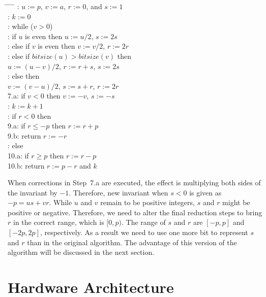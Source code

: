 \documentclass[twocolumn]{IEEEtran}
\begin{document}
\begin{tabbing}
\hspace*{0cm} \= \hspace{0.8cm} \= \hspace{0.5cm} \= \hspace{0.5cm} \= \kill
{}:  \> $u:=p$, $v:=a$, $r:=0$, and $s:=1$\\
:  \> $k:=0$\\
:  \> while ($v > 0$) \\
:  \> \> if $u$ is even then $u:=u/2$, $s:=2s$ \\
:  \> \> else if $v$ is even then $v:=v/2$, $r:=2r$ \\
:  \> \> else if $bitsize(u) > bitsize(v)$ then \\
\>     \> \> \> $u:=(u-v)/2$, $r:=r+s$, $s:=2s$ \\
:  \> \> else then \\
\>     \> \> \> $v:=(v-u)/2$, $s:=s+r$, $r:=2r$ \\
\> 7.a:\> \> \> if $v<0$ then $v := -v$, $s := -s$ \\ 
:  \> \> $k:=k+1$\\
:  \> if $r<0$ then \\
\> 9.a:\> \> if $r \leq -p$ then $r:=r+p$ \\
\> 9.b:\> \> return $r:=-r$ \\
: \> else \\ 
\> 10.a: \> \> if $r \geq p$ then $r:=r-p$ \\
\> 10.b:\> \> return $r:=p-r$ and $k$
\end{tabbing}

When corrections in Step~7.a are executed, the effect is multiplying both sides of
the invariant by $-1$. Therefore, new invariant when $s<0$ is given as
$-p=us+vr$. While $u$ and $v$ remain to be positive integers, $s$ and $r$ 
might be positive or negative. Therefore, we need to alter the final reduction
steps to bring $r$ in the correct range, which is $[0, p)$. The range of $s$ and $r$
are $[-p, p]$ and $[-2p, 2p]$, respectively. As a result we need to use one more bit
to represent $s$ and $r$ than in the original algorithm. The advantage of this
version of the algorithm will be discussed in the next section.

\section {Hardware Architecture}
\end{document}
